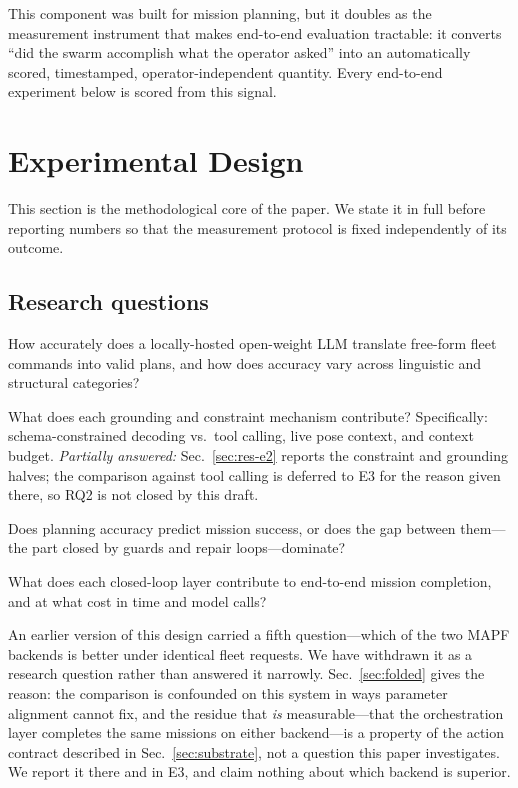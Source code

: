 \documentclass[10pt,twocolumn]{article}
\begin{document}
This component was built for mission planning, but it doubles as the
measurement instrument that makes end-to-end evaluation tractable: it converts
``did the swarm accomplish what the operator asked'' into an automatically
scored, timestamped, operator-independent quantity. Every end-to-end experiment
below is scored from this signal.

\section{Experimental Design}
\label{sec:expdesign}

This section is the methodological core of the paper. We state it in full
before reporting numbers so that the measurement protocol is fixed independently
of its outcome.

\subsection{Research questions}

\begin{description}[leftmargin=2.6em,style=nextline]
\item[RQ1] How accurately does a locally-hosted open-weight LLM translate
free-form fleet commands into valid plans, and how does accuracy vary across
linguistic and structural categories?
\item[RQ2] What does each grounding and constraint mechanism contribute?
Specifically: schema-constrained decoding vs.\ tool calling, live pose context,
and context budget. \emph{Partially answered:} Sec.~\ref{sec:res-e2} reports
the constraint and grounding halves; the comparison against tool calling is
deferred to E3 for the reason given there, so RQ2 is not closed by this draft.
\item[RQ3] Does planning accuracy predict mission success, or does the gap
between them---the part closed by guards and repair loops---dominate?
\item[RQ4] What does each closed-loop layer contribute to end-to-end mission
completion, and at what cost in time and model calls?
\end{description}

An earlier version of this design carried a fifth question---which of the two
MAPF backends is better under identical fleet requests. We have withdrawn it as
a research question rather than answered it narrowly.
Sec.~\ref{sec:folded} gives the reason: the comparison is confounded on this
system in ways parameter alignment cannot fix, and the residue that
\emph{is} measurable---that the orchestration layer completes the same missions
on either backend---is a property of the action contract described in
Sec.~\ref{sec:substrate}, not a question this paper investigates. We report it
there and in E3, and claim nothing about which backend is superior.
\end{document}
